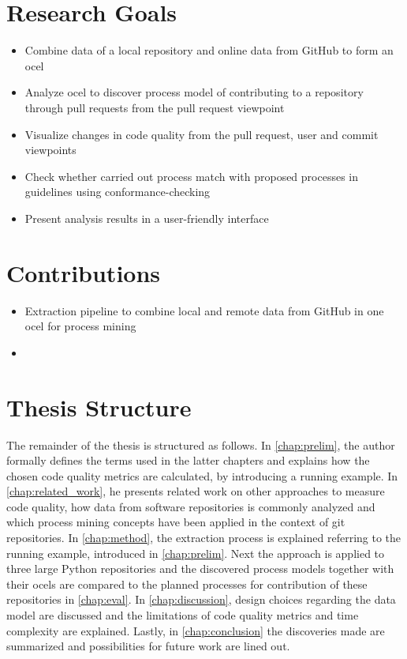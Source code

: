 \section{Research Goals}
\label{sec:intro_ssec:rgs}
\begin{itemize}
	\item Combine data of a local repository and online data from GitHub to form an \ac{ocel}
	\item Analyze \ac{ocel} to discover process model of contributing to a repository through pull requests from the pull request viewpoint
	\item Visualize changes in code quality from the pull request, user and commit viewpoints
	\item Check whether carried out process match with proposed processes in guidelines using conformance-checking
	\item Present analysis results in a user-friendly interface
\end{itemize}


\section{Contributions}
\label{sec:intro_ssec:c}
\begin{itemize}
	\item Extraction pipeline to combine local and remote data from GitHub in one \ac{ocel} for process mining
	\item 
\end{itemize}


\section{Thesis Structure}
\label{sec:intro_ssec:ts}
The remainder of the thesis is structured as follows. In \cref{chap:prelim}, the author formally defines the terms used in the latter chapters and explains how the chosen code quality metrics are calculated, by introducing a running example. In \cref{chap:related_work}, he presents related work on other approaches to measure code quality, how data from software repositories is commonly analyzed and which process mining concepts have been applied in the context of git repositories. In \cref{chap:method}, the extraction process is explained referring to the running example, introduced in \cref{chap:prelim}. Next the approach is applied to three large Python repositories and the discovered process models together with their \acp{ocel} are compared to the planned processes for contribution of these repositories in \cref{chap:eval}. In \cref{chap:discussion}, design choices regarding the data model are discussed and the limitations of code quality metrics and time complexity are explained. Lastly, in \cref{chap:conclusion} the discoveries made are summarized and possibilities for future work are lined out.